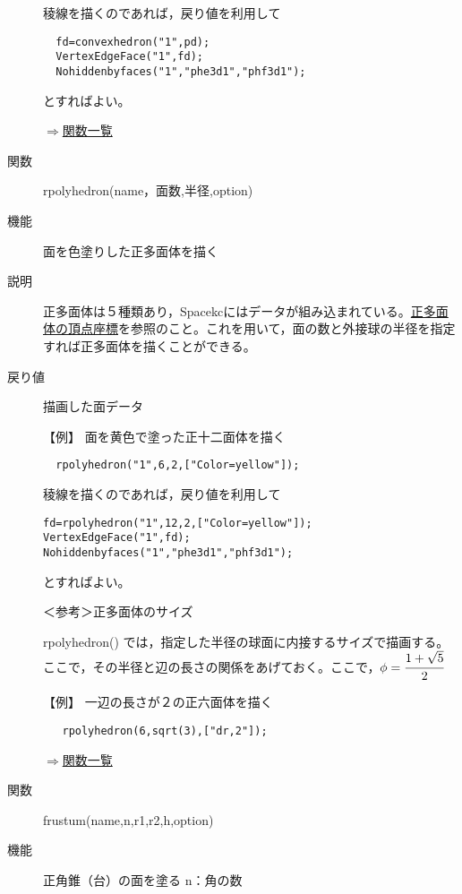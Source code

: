 \documentclass[papersize,a4paper,12pt,uplatex]{jsarticle}
\begin{document}
\begin{description}
稜線を描くのであれば，戻り値を利用して

\begin{verbatim}
  fd=convexhedron("1",pd);
  VertexEdgeFace("1",fd);
  Nohiddenbyfaces("1","phe3d1","phf3d1");
\end{verbatim}
とすればよい。

\begin{flushright} \hyperlink{functionlist}{$\Rightarrow$関数一覧}\end{flushright}

\hypertarget{rpolyhedron}{}
\item[関数] rpolyhedron(name，面数,半径,option)
\item[機能] 面を色塗りした正多面体を描く
\item[説明] 正多面体は５種類あり，Spacekcにはデータが組み込まれている。\hyperlink{rpolydata}{正多面体の頂点座標}を参照のこと。これを用いて，面の数と外接球の半径を指定すれば正多面体を描くことができる。 
\item[戻り値] 描画した面データ

\vspace{\baselineskip}
 【例】 面を黄色で塗った正十二面体を描く 

\verb|  rpolyhedron("1",6,2,["Color=yellow"]);| 

\hspace{20mm}

稜線を描くのであれば，戻り値を利用して
\begin{verbatim}
fd=rpolyhedron("1",12,2,["Color=yellow"]);
VertexEdgeFace("1",fd);
Nohiddenbyfaces("1","phe3d1","phf3d1");
\end{verbatim}
とすればよい。

\vspace{\baselineskip}
＜参考＞正多面体のサイズ 

rpolyhedron() では，指定した半径の球面に内接するサイズで描画する。ここで，その半径と辺の長さの関係をあげておく。ここで，$\phi=\cfrac{1+\sqrt{5}}{2}$ 

     

【例】 一辺の長さが２の正六面体を描く 
\begin{verbatim}
   rpolyhedron(6,sqrt(3),["dr,2"]); 
\end{verbatim}

\begin{flushright} \hyperlink{functionlist}{$\Rightarrow$関数一覧}\end{flushright}


\hypertarget{rfrustum}{}
\item[関数] frustum(name,n,r1,r2,h,option)
\item[機能] 正角錐（台）の面を塗る
n：角の数


\end{description}
\end{document}
